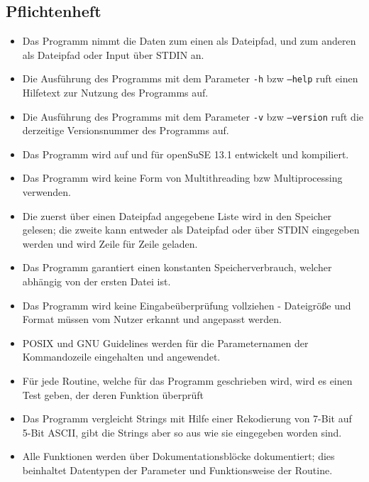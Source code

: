 \subsection{Pflichtenheft}
\label{auszug:pflichtenheft}
\begin{itemize}

    \item Das Programm nimmt die Daten zum einen als Dateipfad, und zum anderen als Dateipfad oder Input über STDIN an.

    \item Die Ausführung des Programms mit dem Parameter \texttt{-h} bzw \texttt{---help} ruft einen Hilfetext zur Nutzung des Programms auf.

    \item Die Ausführung des Programms mit dem Parameter \texttt{-v} bzw \texttt{---version} ruft die derzeitige Versionsnummer des Programms auf.

    \item Das Programm wird auf und für openSuSE 13.1 entwickelt und kompiliert.

    \item Das Programm wird keine Form von Multithreading bzw Multiprocessing verwenden.

    \item Die zuerst über einen Dateipfad angegebene Liste wird in den Speicher gelesen;
    die zweite kann entweder als Dateipfad oder über STDIN eingegeben werden und wird Zeile für Zeile geladen.

    \item Das Programm garantiert einen konstanten Speicherverbrauch, welcher abhängig von der ersten Datei ist.

    \item Das Programm wird keine Eingabeüberprüfung vollziehen - Dateigröße und Format müssen vom Nutzer erkannt und angepasst werden.

    \item POSIX und GNU Guidelines werden für die Parameternamen der Kommandozeile eingehalten und angewendet.

    \item Für jede Routine, welche für das Programm geschrieben wird, wird es einen Test geben, der deren Funktion überprüft

    \item Das Programm vergleicht Strings mit Hilfe einer Rekodierung von 7-Bit auf 5-Bit ASCII, gibt die Strings aber so aus wie sie eingegeben worden sind.

    \item Alle Funktionen werden über Dokumentationsblöcke dokumentiert; dies beinhaltet Datentypen der Parameter und Funktionsweise der Routine.

\end{itemize}
\clearpage

